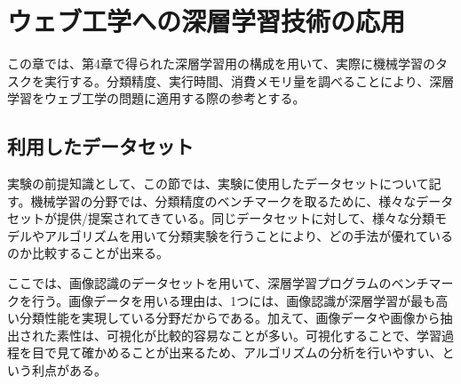 \chapter{ウェブ工学への深層学習技術の応用}
この章では、第4章で得られた深層学習用の構成を用いて、実際に機械学習のタスクを実行する。分類精度、実行時間、消費メモリ量を調べることにより、深層学習をウェブ工学の問題に適用する際の参考とする。
\section{利用したデータセット}
実験の前提知識として、この節では、実験に使用したデータセットについて記す。機械学習の分野では、分類精度のベンチマークを取るために、様々なデータセットが提供/提案されてきている。同じデータセットに対して、様々な分類モデルやアルゴリズムを用いて分類実験を行うことにより、どの手法が優れているのか比較することが出来る。\par
ここでは、画像認識のデータセットを用いて、深層学習プログラムのベンチマークを行う。画像データを用いる理由は、1つには、画像認識が深層学習が最も高い分類性能を実現している分野だからである。加えて、画像データや画像から抽出された素性は、可視化が比較的容易なことが多い。可視化することで、学習過程を目で見て確かめることが出来るため、アルゴリズムの分析を行いやすい、という利点がある。
